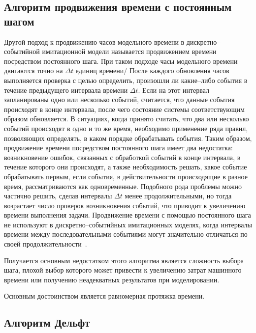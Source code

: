 \subsection{Алгоритм продвижения времени с постоянным шагом}

Другой подход к продвижению часов модельного времени в дискретно--событийной имитационной модели называется продвижением времени посредством постоянного шага. При таком подходе часы модельного времени двигаются точно на $\Delta t$ единиц времени/ После каждого обновления часов выполняется проверка с целью определить, произошли ли какие--либо события в течение предыдущего интервала времени $\Delta t$. Если на этот интервал запланированы одно или несколько событий, считается, что данные события происходят в конце интервала, после чего состояние системы соответствующим образом обновляется. В ситуациях, когда принято считать, что два или несколько событий происходят в одно и то же время, необходимо применение ряда
правил, позволяющих определять, в каком порядке обрабатывать события. Таким образом, продвижение времени посредством постоянного шага имеет два недостатка: возникновение ошибок, связанных с обработкой событий в конце интервала, в течение которого они происходят, а также необходимость решать, какое событие обрабатывать первым, если события, в действительности происходящие в разное время, рассматриваются как одновременные. Подобного рода проблемы можно частично решить, сделав интервалы $\Delta t$ менее продолжительными, но тогда
возрастает число проверок возникновения событий, что приводит к увеличению времени выполнения задачи. Продвижение времени с помощью постоянного шага не используют в дискретно--событийных имитационных моделях, когда интервалы времени между последовательными событиями могут значительно отличаться по своей продолжительности~\cite{time_alg2}. 

Получается основным недостатком этого алгоритма является сложность выбора шага, плохой выбор которого может привести к увеличению затрат машинного времени или получению неадекватных результатов при моделировании.

Основным достоинством является равномерная протяжка времени. 

\subsection{Алгоритм Дельфт}

